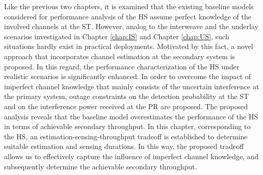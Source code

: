Like the previous two chapters, it is examined that the existing baseline models considered for performance analysis of the HS assume perfect knowledge of the involved channels at the ST. However, analog to the interweave and the underlay scenarios investigated in Chapter \ref{chap:IS} and Chapter \ref{chap:US}, such situations hardly exist in practical deployments. Motivated by this fact, a novel approach that incorporates channel estimation at the secondary system is proposed. In this regard, the performance characterization of the HS under realistic scenarios is significantly enhanced. In order to overcome the impact of imperfect channel knowledge that mainly consists of the uncertain interference at the primary system, outage constraints on the detection probability at the ST and on the interference power received at the PR are proposed. The proposed analysis reveals that the baseline model overestimates the performance of the HS in terms of achievable secondary throughput. In this chapter, corresponding to the HS, an estimation-sensing-throughput tradeoff is established to determine suitable estimation and sensing durations. In this way, the proposed tradeoff allows us to effectively capture the influence of imperfect channel knowledge, and subsequently determine the achievable secondary throughput. 

